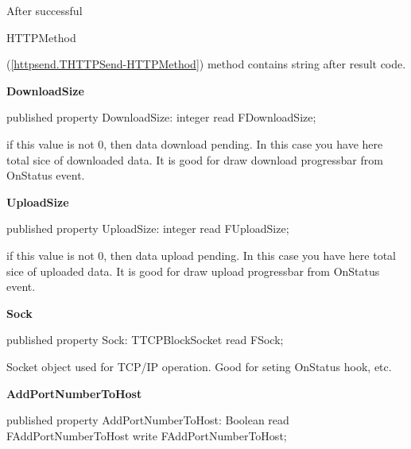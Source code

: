 \documentclass{report}
\newif\ifpdf
\begin{document}
\begin{list}{}
\begin{flushleft}
\ifpdf
\end{flushleft}
\fi


\par After successful \begin{ttfamily}HTTPMethod\end{ttfamily}(\ref{httpsend.THTTPSend-HTTPMethod}) method contains string after result code.\label{httpsend.THTTPSend-DownloadSize}
\item[\textbf{DownloadSize}\hfill]
\ifpdf
\begin{flushleft}
\fi
\begin{ttfamily}
published property DownloadSize: integer read FDownloadSize;\end{ttfamily}

\ifpdf
\end{flushleft}
\fi


\par if this value is not 0, then data download pending. In this case you have here total sice of downloaded data. It is good for draw download progressbar from OnStatus event.\label{httpsend.THTTPSend-UploadSize}
\item[\textbf{UploadSize}\hfill]
\ifpdf
\begin{flushleft}
\fi
\begin{ttfamily}
published property UploadSize: integer read FUploadSize;\end{ttfamily}

\ifpdf
\end{flushleft}
\fi


\par if this value is not 0, then data upload pending. In this case you have here total sice of uploaded data. It is good for draw upload progressbar from OnStatus event.\label{httpsend.THTTPSend-Sock}
\item[\textbf{Sock}\hfill]
\ifpdf
\begin{flushleft}
\fi
\begin{ttfamily}
published property Sock: TTCPBlockSocket read FSock;\end{ttfamily}

\ifpdf
\end{flushleft}
\fi


\par Socket object used for TCP/IP operation. Good for seting OnStatus hook, etc.\label{httpsend.THTTPSend-AddPortNumberToHost}
\item[\textbf{AddPortNumberToHost}\hfill]
\ifpdf
\begin{flushleft}
\fi
\begin{ttfamily}
published property AddPortNumberToHost: Boolean read FAddPortNumberToHost write FAddPortNumberToHost;\end{ttfamily}


\end{flushleft}
\end{list}
\end{document}
